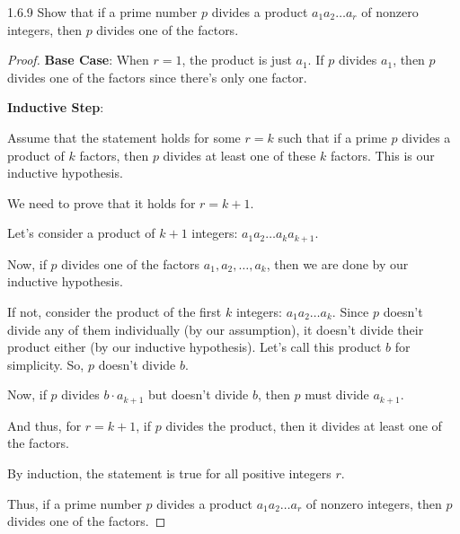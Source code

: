 \documentclass[12pt]{amsart}
\theoremstyle{definition}
\numberwithin{equation}{section}
\theoremstyle{plain}
\begin{document}
\begin{exercise}{1.6.9} Show that if a prime number $p$ divides a product $a_1 a_2 \dots a_r$ of nonzero integers, then $p$ divides one of the factors.
        
    \begin{proof}
\textbf{Base Case}: When \( r = 1 \), the product is just \( a_1 \). If \( p \) divides \( a_1 \), then \( p \) divides one of the factors since there's only one factor.

\textbf{Inductive Step}: 

Assume that the statement holds for some \( r = k \) such that if a prime \( p \) divides a product of \( k \) factors, then \( p \) divides at least one of these \( k \) factors. This is our inductive hypothesis.

We need to prove that it holds for \( r = k + 1 \).

Let's consider a product of \( k+1 \) integers: \( a_1 a_2 \dots a_k a_{k+1} \).

Now, if \( p \) divides one of the factors \( a_1, a_2, \dots, a_k \), then we are done by our inductive hypothesis.

If not, consider the product of the first \( k \) integers: \( a_1 a_2 \dots a_k \). Since \( p \) doesn't divide any of them individually (by our assumption), it doesn't divide their product either (by our inductive hypothesis). Let's call this product \( b \) for simplicity. So, \( p \) doesn't divide \( b \).

Now, if \( p \) divides \( b \cdot a_{k+1} \) but doesn't divide \( b \), then \( p \) must divide \( a_{k+1} \). 

And thus, for \( r = k + 1 \), if \( p \) divides the product, then it divides at least one of the factors.

By induction, the statement is true for all positive integers \( r \).

Thus, if a prime number \( p \) divides a product \( a_1 a_2 \dots a_r \) of nonzero integers, then \( p \) divides one of the factors.
        \end{proof}
\end{exercise}
\end{document}
